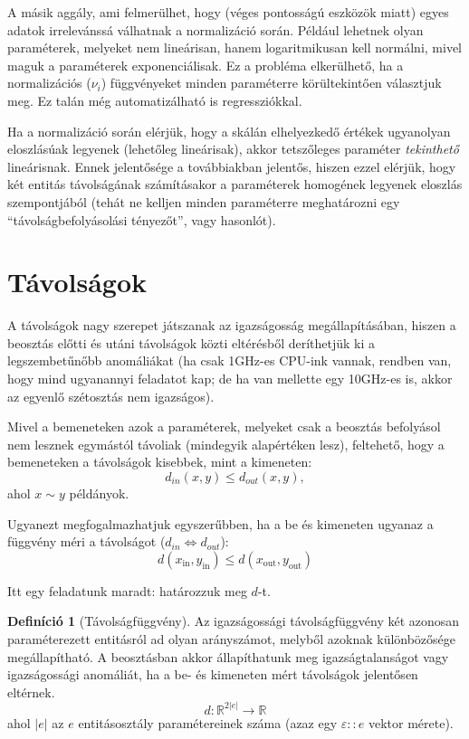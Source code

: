 \documentclass[twocolumn]{article}
\theoremstyle{definition}
\newtheorem{definition}{Definíció}[section]
\newcommand{\subin}[1]{ {#1}_{\text{in}} }
\newcommand{\subout}[1]{ {#1}_{\text{out}} }
\begin{document}
    A másik aggály, ami felmerülhet, hogy (véges pontosságú eszközök miatt) egyes adatok irrelevánssá válhatnak a normalizáció során. Például lehetnek olyan paraméterek, melyeket nem lineárisan, hanem logaritmikusan kell normálni, mivel maguk a paraméterek exponenciálisak. Ez a probléma elkerülhető, ha a normalizációs ($\nu_i$) függvényeket minden paraméterre körültekintően választjuk meg. Ez talán még automatizálható is regressziókkal.
    
    Ha a normalizáció során elérjük, hogy a skálán elhelyezkedő értékek ugyanolyan eloszlásúak legyenek (lehetőleg lineárisak), akkor tetszőleges paraméter {\it tekinthető} lineárisnak. Ennek jelentősége a továbbiakban jelentős, hiszen ezzel elérjük, hogy két entitás távolságának számításakor a paraméterek homogének legyenek eloszlás szempontjából (tehát ne kelljen minden paraméterre meghatározni egy \enquote{távolságbefolyásolási tényezőt}, vagy hasonlót).
    
\section{Távolságok}    
    
    A távolságok nagy szerepet játszanak az igazságosság megállapításában, hiszen a beosztás előtti és utáni távolságok közti eltérésből deríthetjük ki a legszembetűnőbb anomáliákat (ha csak 1GHz-es CPU-ink vannak, rendben van, hogy mind ugyanannyi feladatot kap; de ha van mellette egy 10GHz-es is, akkor az egyenlő szétosztás nem igazságos).
    
    Mivel a bemeneteken azok a paraméterek, melyeket csak a beosztás befolyásol nem lesznek egymástól távoliak (mindegyik alapértéken lesz), feltehető, hogy a bemeneteken a távolságok kisebbek, mint a kimeneten:
    $$ d_{in}(x, y) \leq d_{out}(x, y), $$
    ahol $ x \sim y $ példányok.
    
    Ugyanezt megfogalmazhatjuk egyszerűbben, ha a be és kimeneten ugyanaz a függvény méri a távolságot ($d_{in} \Leftrightarrow d_{out}$):
    \begin{equation}
        d(\subin{x}, \subin{y}) \leq d(\subout{x}, \subout{y})
    \end{equation}
    
    Itt egy feladatunk maradt: határozzuk meg $d$-t.
    
    \begin{definition}[Távolságfüggvény]
        Az igazságossági távolságfüggvény két azonosan paraméterezett entitásról ad olyan arányszámot, melyből azoknak különbözősége megállapítható. A beosztásban akkor állapíthatunk meg igazságtalanságot vagy igazságossági anomáliát, ha a be- és kimeneten mért távolságok jelentősen eltérnek.
        \begin{equation}
            d: \mathbb{R}^{2|e|} \to \mathbb{R}
        \end{equation}
        ahol $|e|$ az $e$ entitásosztály paramétereinek száma (azaz egy $\varepsilon :: e$ vektor mérete).
    \end{definition}
    
\end{document}
